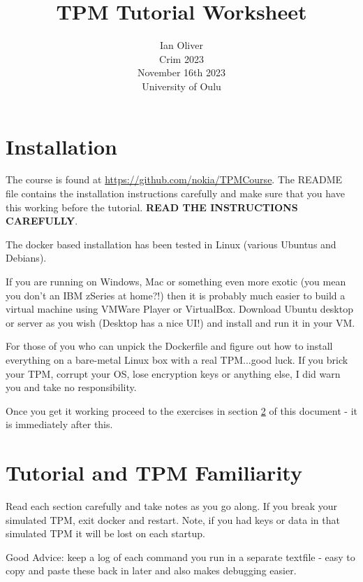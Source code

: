 \documentclass[11pt,a4paper]{article}
\begin{document}
\title{TPM Tutorial Worksheet}
\author{Ian Oliver\\Crim 2023\\November 16th 2023\\University of Oulu}
\maketitle

\tableofcontents


\section{Installation}
The course is found at \url{https://github.com/nokia/TPMCourse}. The README file contains the installation instructions carefully and make sure that you have this working before the tutorial. \textbf{READ THE INSTRUCTIONS CAREFULLY}.

The docker based installation has been tested in Linux (various Ubuntus and Debians).

If you are running on Windows, Mac or something even more exotic (you mean you don't an IBM zSeries at home?!) then it is probably much easier to build a virtual machine using VMWare Player or VirtualBox. Download Ubuntu desktop or server as you wish (Desktop has a nice UI!) and install and run it in your VM.

For those of you who can unpick the Dockerfile and figure out how to install everything on a bare-metal Linux box with a real TPM...good luck. If you brick your TPM, corrupt your OS, lose encryption keys or anything else, I did warn you and take no responsibility.

Once you get it working proceed to the exercises in section \ref{theexercises} of this document - it is immediately after this.



\section{Tutorial and TPM Familiarity}\label{theexercises}
Read each section carefully and take notes as you go along. If you break your simulated TPM, exit docker and restart. Note, if you had keys or data in that simulated TPM it will be lost on each startup.

Good Advice: keep a log of each command you run in a separate textfile - easy to copy and paste these back in later and also makes debugging easier.
\end{document}
